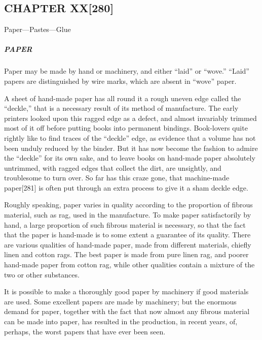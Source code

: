 \documentclass[
]{article}
\begin{document}
\hypertarget{chapter-xx280}{%
\subsection[CHAPTER
XX]{\texorpdfstring{\protect\hypertarget{CHAPTER_XX}{}{}CHAPTER
XX{\protect\hypertarget{Page_280}{}{{[}280{]}}}}{CHAPTER XX{[}280{]}}}\label{chapter-xx280}}

Paper---Pastes---Glue

\hypertarget{paper}{%
\subparagraph{PAPER}\label{paper}}

{Paper} may be made by hand or machinery, and either ``laid'' or
``wove.'' ``Laid'' papers are distinguished by wire marks, which are
absent in ``wove'' paper.

A sheet of hand-made paper has all round it a rough uneven edge called
the ``deckle,'' that is a necessary result of its method of manufacture.
The early printers looked upon this ragged edge as a defect, and almost
invariably trimmed most of it off before putting books into permanent
bindings. Book-lovers quite rightly like to find traces of the
``deckle'' edge, as evidence that a volume has not been unduly reduced
by the binder. But it has now become the fashion to admire the
``deckle'' for its own sake, and to leave books on hand-made paper
absolutely untrimmed, with ragged edges that collect the dirt, are
unsightly, and troublesome to turn over. So far has this craze gone,
that machine-made paper{\protect\hypertarget{Page_281}{}{{[}281{]}}} is
often put through an extra process to give it a sham deckle edge.

Roughly speaking, paper varies in quality according to the proportion of
fibrous material, such as rag, used in the manufacture. To make paper
satisfactorily by hand, a large proportion of such fibrous material is
necessary, so that the fact that the paper is hand-made is to some
extent a guarantee of its quality. There are various qualities of
hand-made paper, made from different materials, chiefly linen and cotton
rags. The best paper is made from pure linen rag, and poorer hand-made
paper from cotton rag, while other qualities contain a mixture of the
two or other substances.

It is possible to make a thoroughly good paper by machinery if good
materials are used. Some excellent papers are made by machinery; but the
enormous demand for paper, together with the fact that now almost any
fibrous material can be made into paper, has resulted in the production,
in recent years, of, perhaps, the worst papers that have ever been seen.
\end{document}
